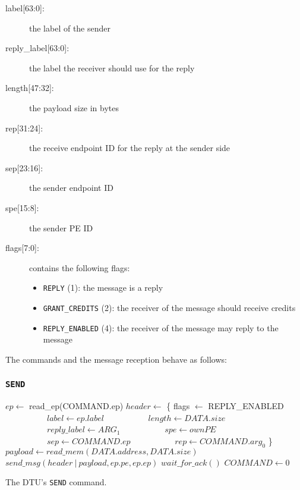 \documentclass[a4paper,11pt,draft]{article}
\begin{document}
\begin{description}
  \item[label{[63:0]}:] the label of the sender
  \item[reply\_label{[63:0]}:] the label the receiver should use for the reply
  \item[length{[47:32]}:] the payload size in bytes
  \item[rep{[31:24]}:] the receive endpoint ID for the reply at the sender side
  \item[sep{[23:16]}:] the sender endpoint ID
  \item[spe{[15:8]}:] the sender PE ID
  \item[flags{[7:0]}:] contains the following flags:
  \begin{itemize}
    \item \texttt{REPLY} (1): the message is a reply
    \item \texttt{GRANT\_CREDITS} (2): the receiver of the message should receive credits
    \item \texttt{REPLY\_ENABLED} (4): the receiver of the message may reply to the message
  \end{itemize}
\end{description}

\noindent The commands and the message reception behave as follows:

\subsubsection{\texttt{SEND}}

\begin{algorithm}[H]
    $ep \gets$ read\_ep(COMMAND.ep)\;
    \BlankLine
    $header \gets$ \{ flags $\gets$ REPLY\_ENABLED\;
    $\quad\quad\quad\quad\quad label \gets ep.label$\;
    $\quad\quad\quad\quad\quad length \gets DATA.size$\;
    $\quad\quad\quad\quad\quad reply\_label \gets ARG_1$\;
    $\quad\quad\quad\quad\quad spe \gets ownPE$\;
    $\quad\quad\quad\quad\quad sep \gets COMMAND.ep$\;
    $\quad\quad\quad\quad\quad rep \gets COMMAND.arg_0$ \}\;
    $payload \gets read\_mem(DATA.address, DATA.size)$\;
    $send\_msg(header\ |\ payload, ep.pe, ep.ep)$\;
    $wait\_for\_ack()$\;
    \BlankLine
    $COMMAND \gets 0$\;
    \caption{The DTU's \texttt{SEND} command.}
\end{algorithm}
\end{document}
